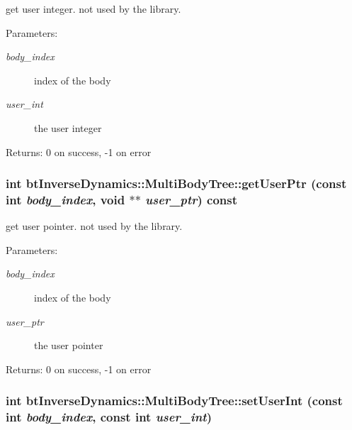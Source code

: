 get user integer. not used by the library. \begin{Desc}
\item[Parameters:]
\begin{description}
\item[{\em body\_\-index}]index of the body \item[{\em user\_\-int}]the user integer \end{description}
\end{Desc}
\begin{Desc}
\item[Returns:]0 on success, -1 on error \end{Desc}
\hypertarget{classbt_inverse_dynamics_1_1_multi_body_tree_32df6e169921b17d1bce944dc83918e9}{
\subsubsection[getUserPtr]{\setlength{\rightskip}{0pt plus 5cm}int btInverseDynamics::MultiBodyTree::getUserPtr (const int {\em body\_\-index}, \/  void $\ast$$\ast$ {\em user\_\-ptr}) const}}
\label{classbt_inverse_dynamics_1_1_multi_body_tree_32df6e169921b17d1bce944dc83918e9}


get user pointer. not used by the library. \begin{Desc}
\item[Parameters:]
\begin{description}
\item[{\em body\_\-index}]index of the body \item[{\em user\_\-ptr}]the user pointer \end{description}
\end{Desc}
\begin{Desc}
\item[Returns:]0 on success, -1 on error \end{Desc}
\hypertarget{classbt_inverse_dynamics_1_1_multi_body_tree_f93f698a6d22d8f735f162c326649342}{
\subsubsection[setUserInt]{\setlength{\rightskip}{0pt plus 5cm}int btInverseDynamics::MultiBodyTree::setUserInt (const int {\em body\_\-index}, \/  const int {\em user\_\-int})}}
\label{classbt_inverse_dynamics_1_1_multi_body_tree_f93f698a6d22d8f735f162c326649342}


